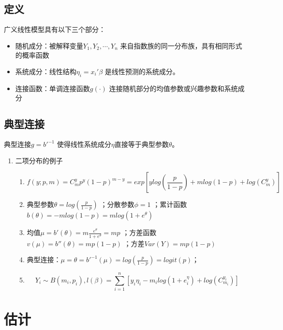 \documentclass[
]{book}
\providecommand{\tightlist}{%
  \setlength{\itemsep}{0pt}\setlength{\parskip}{0pt}}
\begin{document}
\subsection{定义}\label{ux5b9aux4e49}

广义线性模型具有以下三个部分：

\begin{itemize}
\item
  随机成分：被解释变量\(Y_1,Y_2,\cdots,Y_n\) 来自指数族的同一分布族，具有相同形式的概率函数
\item
  系统成分：线性结构\(\eta_i=x_i'\beta\) 是线性预测的系统成分。
\item
  连接函数：单调连接函数\(g(\cdot)\) 连接随机部分的均值参数或兴趣参数和系统成分
\end{itemize}

\subsection{典型连接}\label{ux5178ux578bux8fdeux63a5}

典型连接\(g=b'^{-1}\) 使得线性系统成分\(\eta\)直接等于典型参数\(\theta\)。

\begin{enumerate}
\def\labelenumi{\arabic{enumi}.}
\tightlist
\item
  二项分布的例子

  \begin{enumerate}
  \def\labelenumii{\arabic{enumii}.}
  \tightlist
  \item
    \[
    f(y;p,m)=C_m^yp^y(1-p)^{m-y}=exp[ylog(\frac{p}{1-p})+mlog(1-p)+log(C_m^y)]
    \]
  \item
    典型参数\(\theta = log(\frac{p}{1-p})\) ；分散参数\(\phi=1\) ；累计函数\(b(\theta)=-mlog(1-p)=mlog(1+e^{\theta})\)
  \item
    均值\(\mu = b'(\theta) = m\frac{e^{\theta}}{1+e^{\theta}}=mp\) ；方差函数\(v(\mu)=b''(\theta)=mp(1-p)\) ；方差\(Var(Y)=mp(1-p)\)
  \item
    典型连接：\(\mu=\theta=b'^{-1}(\mu)=log(\frac{p}{1-p})=logit(p)\)；
  \item
    \[
    Y_i\sim B(m_i,p_i),l(\beta)=\sum_{i=1}^n[y_i\eta_i-m_ilog(1+e_i^{\eta})+log(C_{m_i}^{y_i})]
    \]
  \end{enumerate}
\end{enumerate}

\section{估计}\label{ux4f30ux8ba1}
\end{document}
